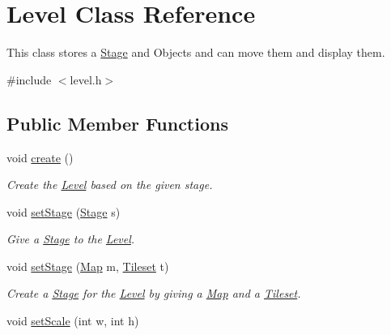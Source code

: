 \hypertarget{classLevel}{}\section{Level Class Reference}
\label{classLevel}


This class stores a \hyperlink{classStage}{Stage} and Objects and can move them and display them.  




{\ttfamily \#include $<$level.\+h$>$}

\subsection*{Public Member Functions}
\begin{DoxyCompactItemize}
\item 
void \hyperlink{classLevel_a81689e48aaf6d5421721bd06f480e4e1}{create} ()\hypertarget{classLevel_a81689e48aaf6d5421721bd06f480e4e1}{}\label{classLevel_a81689e48aaf6d5421721bd06f480e4e1}

\begin{DoxyCompactList}\small\item\em Create the \hyperlink{classLevel}{Level} based on the given stage. \end{DoxyCompactList}\item 
void \hyperlink{classLevel_ac9bb5473dece11462e702fe418590f24}{set\+Stage} (\hyperlink{classStage}{Stage} s)\hypertarget{classLevel_ac9bb5473dece11462e702fe418590f24}{}\label{classLevel_ac9bb5473dece11462e702fe418590f24}

\begin{DoxyCompactList}\small\item\em Give a \hyperlink{classStage}{Stage} to the \hyperlink{classLevel}{Level}. \end{DoxyCompactList}\item 
void \hyperlink{classLevel_a962fd10cb871d2fdd98230dc079bff34}{set\+Stage} (\hyperlink{classMap}{Map} m, \hyperlink{classTileset}{Tileset} t)\hypertarget{classLevel_a962fd10cb871d2fdd98230dc079bff34}{}\label{classLevel_a962fd10cb871d2fdd98230dc079bff34}

\begin{DoxyCompactList}\small\item\em Create a \hyperlink{classStage}{Stage} for the \hyperlink{classLevel}{Level} by giving a \hyperlink{classMap}{Map} and a \hyperlink{classTileset}{Tileset}. \end{DoxyCompactList}\item 
void \hyperlink{classLevel_a3fcaa774a00e39090336b5a61d88e3e2}{set\+Scale} (int w, int h)\hypertarget{classLevel_a3fcaa774a00e39090336b5a61d88e3e2}{}\label{classLevel_a3fcaa774a00e39090336b5a61d88e3e2}


\end{DoxyCompactItemize}
